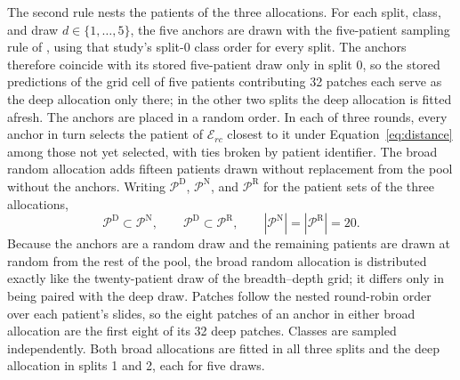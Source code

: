 \documentclass[11pt]{article}
\begin{document}
The second rule nests the patients of the three allocations. For each split, class, and draw $d\in\{1,\ldots,5\}$, the five anchors are drawn with the five-patient sampling rule of \citet{queisler2026effectiveSupport}, using that study's split-0 class order for every split. The anchors therefore coincide with its stored five-patient draw only in split 0, so the stored predictions of the grid cell of five patients contributing 32 patches each serve as the deep allocation only there; in the other two splits the deep allocation is fitted afresh. The anchors are placed in a random order. In each of three rounds, every anchor in turn selects the patient of $\mathcal E_{rc}$ closest to it under Equation~\eqref{eq:distance} among those not yet selected, with ties broken by patient identifier. The broad random allocation adds fifteen patients drawn without replacement from the pool without the anchors. Writing $\mathcal P^{\mathrm D}$, $\mathcal P^{\mathrm N}$, and $\mathcal P^{\mathrm R}$ for the patient sets of the three allocations,
\begin{equation}
 \mathcal P^{\mathrm D}\subset\mathcal P^{\mathrm N},
 \qquad
 \mathcal P^{\mathrm D}\subset\mathcal P^{\mathrm R},
 \qquad
 |\mathcal P^{\mathrm N}|=|\mathcal P^{\mathrm R}|=20.
 \label{eq:nesting}
\end{equation}
\noindent Because the anchors are a random draw and the remaining patients are drawn at random from the rest of the pool, the broad random allocation is distributed exactly like the twenty-patient draw of the breadth--depth grid; it differs only in being paired with the deep draw. Patches follow the nested round-robin order over each patient's slides, so the eight patches of an anchor in either broad allocation are the first eight of its 32 deep patches. Classes are sampled independently. Both broad allocations are fitted in all three splits and the deep allocation in splits 1 and 2, each for five draws.
\end{document}
